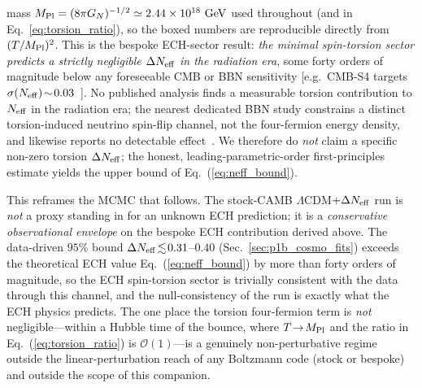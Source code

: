 \documentclass[aps,prd,twocolumn,superscriptaddress,showpacs,preprintnumbers,nofootinbib,longbibliography,floatfix]{revtex4-2}
\newcommand{\Neff}{N_{\rm eff}}
\begin{document}
mass $M_{\rm Pl}=(8\pi G_N)^{-1/2}\simeq 2.44\times10^{18}\ \mathrm{GeV}$
used throughout (and in Eq.~\ref{eq:torsion_ratio}), so the boxed numbers are
reproducible directly from $(T/M_{\rm Pl})^2$.
This is the bespoke ECH-sector result: \emph{the minimal spin-torsion sector
predicts a strictly negligible $\Delta\Neff$ in the radiation era}, some forty
orders of magnitude below any foreseeable CMB or BBN sensitivity
[e.g.\ CMB-S4 targets $\sigma(\Neff)\!\sim\!0.03$~\cite{CMBS4_ScienceBook}].
No published analysis finds a measurable torsion contribution to $\Neff$ in the
radiation era; the nearest dedicated BBN study
constrains a distinct torsion-induced neutrino spin-flip channel, not the
four-fermion energy density, and likewise reports no detectable
effect~\cite{Bruggen1999}. We therefore do \emph{not} claim a specific
non-zero torsion $\Delta\Neff$; the honest, leading-parametric-order first-principles estimate yields the
upper bound of Eq.~(\ref{eq:neff_bound}).

This reframes the MCMC that follows. The stock-CAMB $\Lambda$CDM$+\Delta\Neff$
run is \emph{not} a proxy standing in for an unknown ECH prediction; it is a
\emph{conservative observational envelope} on the bespoke ECH contribution
derived above. The data-driven $95\%$ bound $\Delta\Neff\!\lesssim\!0.31$--$0.40$
(Sec.~\ref{sec:p1b_cosmo_fits}) exceeds the theoretical ECH value
Eq.~(\ref{eq:neff_bound}) by more than forty orders of magnitude, so the ECH
spin-torsion sector is trivially consistent with the data through this channel,
and the null-consistency of the run is exactly what the ECH physics predicts.
The one place the torsion four-fermion term is \emph{not} negligible---within a
Hubble time of the bounce, where $T\!\to\!M_{\rm Pl}$ and the ratio in
Eq.~(\ref{eq:torsion_ratio}) is $\mathcal{O}(1)$---is a genuinely
non-perturbative regime outside the linear-perturbation reach of any Boltzmann
code (stock or bespoke) and outside the scope of this companion.
\end{document}
